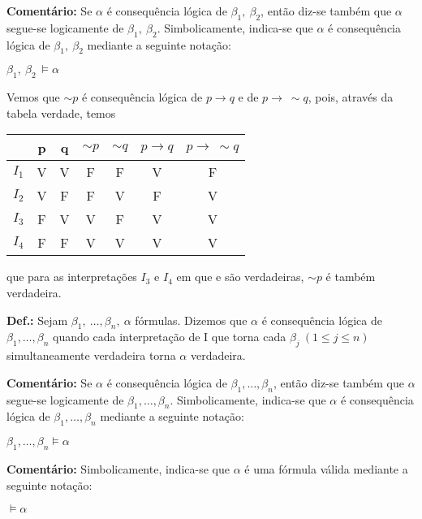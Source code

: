 \bigskip
\noindent
\textbf{Comentário:} Se $\alpha$ é consequência lógica de $\beta_1,\ \beta_2$, então diz-se também que $\alpha$ segue-se logicamente de $\beta_1,\ \beta_2$.
Simbolicamente, indica-se que $\alpha$ é consequência lógica de $\beta_1,\ \beta_2$ mediante a seguinte notação:

\centerline{$\beta_1,\ \beta_2\ \vDash \alpha$} %

\begin{exemplo}
    Vemos que $\sim p$ é consequência lógica de $p \to q$ e de $p \to\ \sim q$, pois, através da tabela verdade, temos
\end{exemplo}

\begin{center}
    \begin{tabular}{c | c c c c c c}
              & p & q & $\sim p$ & $\sim q$ & $p \to q$ & $p \to\ \sim q$ \\ \hline
        $I_1$ & V & V & F        & F        & V         & F \\
        $I_2$ & V & F & F        & V        & F         & V \\
        $I_3$ & F & V & V        & F        & V         & V \\
        $I_4$ & F & F & V        & V        & V         & V \\
    \end{tabular}
\end{center}
que para as interpretações $I_3$ e $I_4$ em que  e  são verdadeiras, $\sim p$ é também verdadeira.

\bigskip
\noindent
\textbf{Def.:} Sejam $\beta_1,\ \dots, \beta_n,\ \alpha$ fórmulas.
Dizemos que $\alpha$ é consequência lógica de $\beta_1,\dots, \beta_n$ quando cada interpretação de I que torna cada $\beta_j\ (1 \leq j \leq n)$ simultaneamente verdadeira torna $\alpha$ verdadeira.

\bigskip
\noindent
\textbf{Comentário:} Se $\alpha$ é consequência lógica de $\beta_1,\dots, \beta_n$, então diz-se também que $\alpha$ segue-se logicamente de $\beta_1,\dots, \beta_n$.
Simbolicamente, indica-se que $\alpha$ é consequência lógica de $\beta_1,\dots, \beta_n$ mediante a seguinte notação:

\centerline{$\beta_1,\dots, \beta_n \vDash \alpha$}

\bigskip
\noindent
\textbf{Comentário:} Simbolicamente, indica-se que $\alpha$ é uma fórmula válida mediante a seguinte notação:

\centerline{$\vDash \alpha$}

